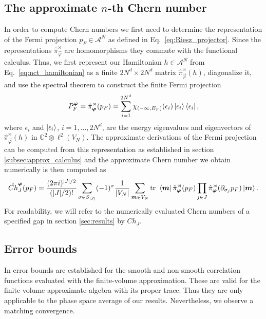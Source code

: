 \documentclass[submission, Phys]{SciPost}
\begin{document}
\subsection{The approximate \texorpdfstring{$n$}{n}-th Chern number}
In order to compute Chern numbers we first need to determine the representation of the Fermi projection $p_F\in\mathcal{A}^N$ as defined in Eq.~\eqref{eq:Riesz_projector}.
Since the representations $\hat{\pi}^\rtimes_{ \vec{\varphi}}$ are homomorphisms they commute with the functional calculus.
Thus, we first represent our Hamiltonian $h\in\mathcal{A}^N$ from Eq.~\eqref{eq:nct_hamiltonian} as a finite $2N^d\times2N^d$ matrix $\hat{\pi}^\rtimes_{ \vec{\varphi}}(h)$, diagonalize it, and use the spectral theorem to construct the finite Fermi projection
\begin{equation}
P^{\boldsymbol{\varphi}}_F = \hat{\pi}^\rtimes_{ \boldsymbol{\varphi}}(p_F) = \sum_{i=1}^{2N^d} \chi_{(-\infty,E_F)}(\epsilon_i) \ket{\epsilon_i}\bra{\epsilon_i},
\label{eq:Fermi_projection}
\end{equation}
where $\epsilon_i$ and $\ket{\epsilon_i}$, $i=1,\dots,2N^d$, are the energy eigenvalues and eigenvectors of $\hat{\pi}^\rtimes_{ \vec{\varphi}}(h)$ in $\mathbb{C}^2\otimes\ell^2(V_N)$.
The approximate derivations of the Fermi projection can be computed from this representation as established in section \ref{subsec:approx_calculus} and the approximate Chern number we obtain numerically is then computed as
\begin{align}
    \hat{Ch}^{\boldsymbol{\varphi}}_J(p_F) = \frac{(2\pi i )^{ | J| /2 }}{(| J| /2)!}  \sum_{\sigma \in S_{|J|} } (-1)^\sigma \frac{1}{|V_N|} \sum_{\boldsymbol{m} \in V_N} \mathrm{tr}~ \bra{\boldsymbol{m}} \hat{\pi}^\rtimes_{\boldsymbol{\varphi}}(p_F) \prod_{j \in J} \hat{\pi}^\rtimes_{\boldsymbol{\varphi}}(\partial_{\sigma_j} p_F) \ket{\boldsymbol{m}}.
    \label{eq:approx_Chernnumber}
\end{align}
For readability, we will refer to the numerically evaluated Chern numbers of a specified gap in section \ref{sec:results} by $Ch_J$.

\subsection{Error bounds}
\label{subsec:error}
In \cite[Chap. 6, 8]{Prodan2017} error bounds are established for the smooth and non-smooth correlation functions evaluated with the finite-volume approximation.
These are valid for the finite-volume approximate algebra with its proper trace. Thus they are only applicable to the phase space average of our results. Nevertheless, we observe a matching convergence.
\end{document}

